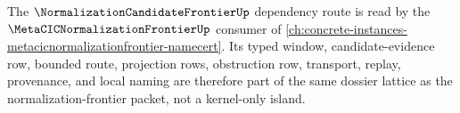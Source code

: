 The $\NormalizationCandidateFrontierUp$ dependency route is read by the $\MetaCICNormalizationFrontierUp$ consumer of \autoref{ch:concrete-instances-metacicnormalizationfrontier-namecert}. Its typed window, candidate-evidence row, bounded route, projection rows, obstruction row, transport, replay, provenance, and local naming are therefore part of the same dossier lattice as the normalization-frontier packet, not a kernel-only island.

